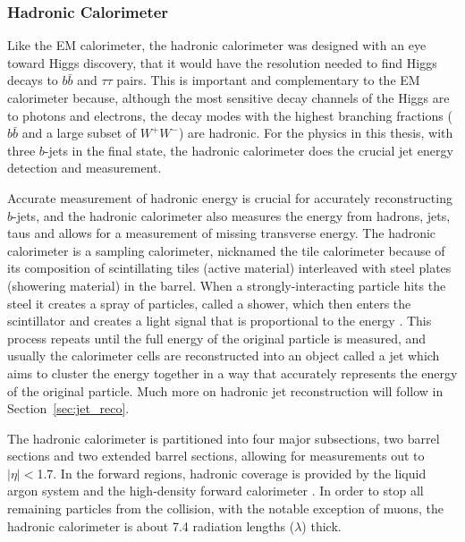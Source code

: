 \subsubsection{Hadronic Calorimeter} 
\label{sec:h_cal}
Like the EM calorimeter, the hadronic calorimeter was designed with an eye toward Higgs discovery, that it would
have the resolution needed to find Higgs decays to $b\bar{b}$ and $\tau\tau$ pairs.  This is important and complementary
to the EM calorimeter because, although the most sensitive decay channels of the Higgs are to photons and electrons,
the decay modes with the highest branching fractions ($b\bar{b}$ and a large subset of $W^+W^-$) are hadronic.
For the physics in this thesis, with three $b$-jets in the final state, the hadronic calorimeter does the crucial
jet energy detection and measurement. 

Accurate measurement of hadronic energy is crucial for accurately reconstructing $b$-jets, and the hadronic calorimeter also measures the 
energy from hadrons, jets, taus and allows for a measurement of missing transverse energy.  The hadronic calorimeter 
is a sampling calorimeter, nicknamed the tile calorimeter because of its composition of scintillating tiles (active material) 
interleaved with steel plates (showering material) in the barrel.  When a strongly-interacting particle hits the steel it creates a 
spray of particles, called a shower, which then enters the scintillator and creates a light signal that is 
proportional to the energy .  This process repeats until the full energy of the original particle is measured, and 
usually the calorimeter cells are reconstructed into an object called a jet which aims to cluster the energy together in 
a way that accurately represents the energy of the original particle.  Much more on hadronic jet reconstruction will follow in Section~\ref{sec:jet_reco}.

The hadronic calorimeter is partitioned into four major subsections, two barrel sections and two extended barrel sections, allowing 
for measurements out to $|\eta|<$1.7.  In the forward regions, hadronic coverage is provided by the liquid argon system and the high-density forward calorimeter \cite{cal_tdr}. In order to stop all remaining particles from the collision, 
with the notable exception of muons, the hadronic calorimeter is about 7.4 radiation lengths ($\lambda$) thick.

